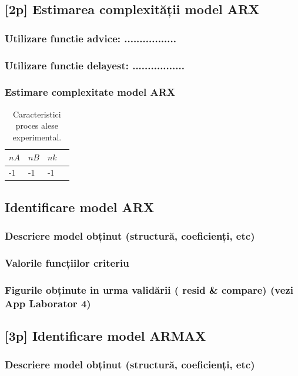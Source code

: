 \documentclass[12pt,english]{article}
\begin{document}
\subsection { [2p] Estimarea complexității model ARX }
\subsubsection { Utilizare functie advice: ................. }
\subsubsection { Utilizare functie delayest: ................. }
\subsubsection { Estimare complexitate model ARX }
\begin{table}[h!]
  \centering
    \begin{tabular}{|l|l|l|l|}
      \hline
      $nA$ & $nB$ & $nk$ \\
      \hline
      -1 & -1 & -1 \\
      \hline
    \end{tabular}
    \caption{Caracteristici proces alese experimental.}
\end{table}

\subsection { Identificare model ARX }
\subsubsection { Descriere model obținut (structură, coeficienți, etc) }
\subsubsection { Valorile funcțiilor criteriu }
\subsubsection { Figurile obținute in urma validării ( resid \& compare) (vezi App Laborator 4) }
\subsection { [3p] Identificare model ARMAX }
\subsubsection { Descriere model obținut (structură, coeficienți, etc) }
\end{document}
